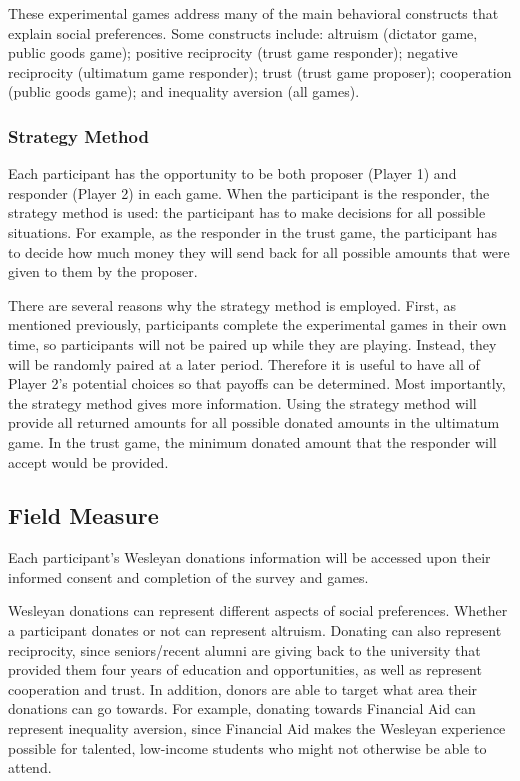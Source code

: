 \documentclass{article}
\begin{document}
These experimental games address many of the main behavioral constructs that explain social preferences. Some constructs include: altruism (dictator game, public goods game); positive reciprocity (trust game responder); negative reciprocity (ultimatum game responder); trust (trust game proposer); cooperation (public goods game); and inequality aversion (all games). 

\subsubsection{Strategy Method}

Each participant has the opportunity to be both proposer (Player 1) and responder (Player 2) in each game. When the participant is the responder, the strategy method is used: the participant has to make decisions for all possible situations. For example, as the responder in the trust game, the participant has to decide how much money they will send back for all possible amounts that were given to them by the proposer. 

There are several reasons why the strategy method is employed. First, as mentioned previously, participants complete the experimental games in their own time, so participants will not be paired up while they are playing. Instead, they will be randomly paired at a later period. Therefore it is useful to have all of Player 2\rq s potential choices so that payoffs can be determined. Most importantly, the strategy method gives more information. Using the strategy method will provide all returned amounts for all possible donated amounts in the ultimatum game. In the trust game, the minimum donated amount that the responder will accept would be provided. 

\subsection{Field Measure}

Each participant\rq s Wesleyan donations information will be accessed upon their informed consent and completion of the survey and games. 

Wesleyan donations can represent different aspects of social preferences. Whether a participant donates or not can represent altruism. Donating can also represent reciprocity, since seniors/recent alumni are giving back to the university that provided them four years of education and opportunities, as well as represent cooperation and trust. In addition, donors are able to target what area their donations can go towards. For example, donating towards Financial Aid can represent inequality aversion, since Financial Aid makes the Wesleyan experience possible for talented, low-income students who might not otherwise be able to attend.  
\end{document}
